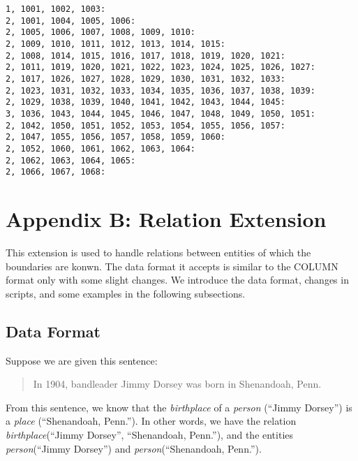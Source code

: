 \documentclass[11pt]{article}
\begin{document}
{\tt 1, 1001, 1002, 1003: \\ 
2, 1001, 1004, 1005, 1006: \\ 
2, 1005, 1006, 1007, 1008, 1009, 1010: \\ 
2, 1009, 1010, 1011, 1012, 1013, 1014, 1015: \\ 
2, 1008, 1014, 1015, 1016, 1017, 1018, 1019, 1020, 1021: \\ 
2, 1011, 1019, 1020, 1021, 1022, 1023, 1024, 1025, 1026, 1027: \\ 
2, 1017, 1026, 1027, 1028, 1029, 1030, 1031, 1032, 1033: \\ 
2, 1023, 1031, 1032, 1033, 1034, 1035, 1036, 1037, 1038, 1039: \\ 
2, 1029, 1038, 1039, 1040, 1041, 1042, 1043, 1044, 1045: \\ 
3, 1036, 1043, 1044, 1045, 1046, 1047, 1048, 1049, 1050, 1051: \\ 
2, 1042, 1050, 1051, 1052, 1053, 1054, 1055, 1056, 1057: \\ 
2, 1047, 1055, 1056, 1057, 1058, 1059, 1060: \\ 
2, 1052, 1060, 1061, 1062, 1063, 1064: \\ 
2, 1062, 1063, 1064, 1065: \\ 
2, 1066, 1067, 1068:}

\section*{Appendix B: Relation Extension}

This extension is used to handle relations between entities 
of which the boundaries are konwn.  The data format it accepts
is similar to the COLUMN format only with some slight changes.  We introduce
the data format, changes in scripts, and some examples in the following
subsections.

\subsection*{Data Format}

Suppose we are given this sentence:

\begin{quote}
In 1904, bandleader Jimmy Dorsey was born in Shenandoah, Penn.
\end{quote}

From this sentence, we know that the \emph{birthplace} of a \emph{person} (``Jimmy Dorsey'')
is a \emph{place} (``Shenandoah, Penn.'').  In other words, we have the relation 
\emph{birthplace}(``Jimmy Dorsey'', ``Shenandoah, Penn.''), and the entities 
\emph{person}(``Jimmy Dorsey'') and \emph{person}(``Shenandoah, Penn.'').
\end{document}

